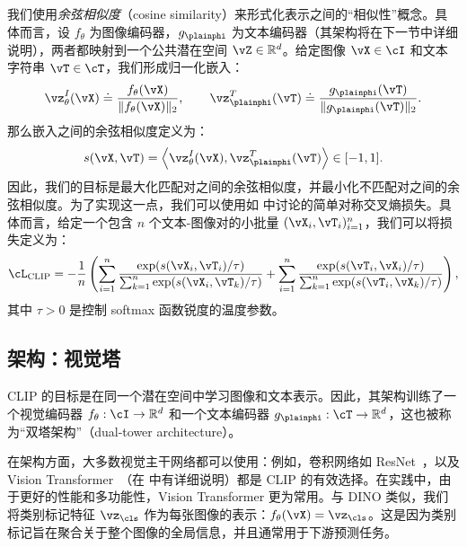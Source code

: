 \documentclass[../../book-main_zh.tex]{subfiles}
\begin{document}
我们使用\textit{余弦相似度}（cosine similarity）来形式化表示之间的“相似性”概念。具体而言，设 \(f_{\theta}\) 为图像编码器，\(g_{\plainphi}\) 为文本编码器（其架构将在下一节中详细说明），两者都映射到一个公共潜在空间 \(\vZ \in \mathbb{R}^{d}\)。给定图像 \(\vX \in \cI\) 和文本字符串 \(\vT \in \cT\)，我们形成归一化嵌入：
\begin{equation}
    \vz^{I}_{\theta}(\vX) \doteq \frac{f_{\theta}(\vX)}{\|f_{\theta}(\vX)\|_2},
    \qquad
    \vz^{T}_{\plainphi}(\vT) \doteq \frac{g_{\plainphi}(\vT)}{\|g_{\plainphi}(\vT)\|_2}.
\end{equation}
那么嵌入之间的余弦相似度定义为：
\begin{equation}
    s(\vX,\vT)
    =
    \left\langle \vz^{I}_{\theta}(\vX), \vz^{T}_{\plainphi}(\vT)\right\rangle
    \in [-1,1].
\end{equation}
因此，我们的目标是最大化匹配对之间的余弦相似度，并最小化不匹配对之间的余弦相似度。为了实现这一点，我们可以使用如  中讨论的简单对称交叉熵损失。具体而言，给定一个包含 \(n\) 个文本-图像对的小批量 \((\vX_i, \vT_i)_{i=1}^{n}\)，我们可以将损失定义为：
\begin{equation}\label{eq:practical_clip_loss}
    \cL_{\text{CLIP}} = -\frac{1}{n}\left(
    \sum_{i=1}^{n}
    \frac{\exp(s(\vX_i,\vT_i)/\tau)}{\sum_{k=1}^{n}\exp(s(\vX_i,\vT_k)/\tau)}
    +
    \sum_{i=1}^{n}
    \frac{\exp(s(\vT_i,\vX_i)/\tau)}{\sum_{k=1}^{n}\exp(s(\vT_i,\vX_k)/\tau)}
    \right),
\end{equation}
其中 \(\tau > 0\) 是控制 softmax 函数锐度的温度参数。 

\subsection{架构：视觉塔}\label{sub:clip_vision_tower}
CLIP 的目标是在同一个潜在空间中学习图像和文本表示。因此，其架构训练了一个视觉编码器 \(f_{\theta}: \cI \to \mathbb{R}^{d} \) 和一个文本编码器 \(g_{\plainphi}: \cT \to \mathbb{R}^{d} \)，这也被称为“双塔架构”（dual-tower architecture）。

在架构方面，大多数视觉主干网络都可以使用：例如，卷积网络如 ResNet~\citep{He2016-lc}，以及 Vision Transformer~\citep{dosovitskiy2020image}（在  中有详细说明）都是 CLIP 的有效选择。在实践中，由于更好的性能和多功能性，Vision Transformer 更为常用。与 DINO 类似，我们将类别标记特征 \(\vz_{\cls}\) 作为每张图像的表示：\(f_{\theta}(\vX) = \vz_{\cls}\)。这是因为类别标记旨在聚合关于整个图像的全局信息，并且通常用于下游预测任务。
\end{document}
